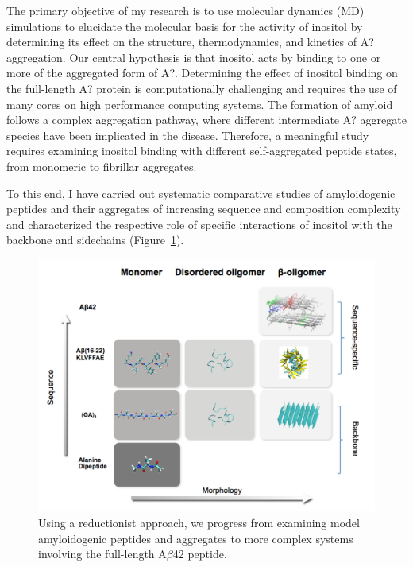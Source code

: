 The primary objective of my research is to use molecular dynamics (MD) simulations to elucidate the molecular basis for the activity of inositol by determining its effect on the structure, thermodynamics, and kinetics of A? aggregation.  Our central hypothesis is that inositol acts by binding to one or more of the aggregated form of A?.  Determining the effect of inositol binding on the full-length A? protein is computationally challenging and requires the use of many cores on high performance computing systems. The formation of amyloid follows a complex aggregation pathway, where different intermediate A? aggregate species have been implicated in the disease. Therefore, a meaningful study requires examining inositol binding with different self-aggregated peptide states, from monomeric to fibrillar aggregates. 

To this end, I have carried out systematic comparative studies of amyloidogenic peptides and their aggregates of increasing sequence and composition complexity and characterized the respective role of specific interactions of inositol with the backbone and sidechains (Figure~\ref{fig:rationale}).

\begin{figure}
\centering
\includegraphics[width=6in]{figures/introduction/matrix.pdf}
\caption[Thesis Rationale]{Using a reductionist approach, we progress from examining model amyloidogenic peptides and aggregates to more complex systems involving the full-length A$\beta$42 peptide.}
\label{fig:rationale}
\end{figure}

